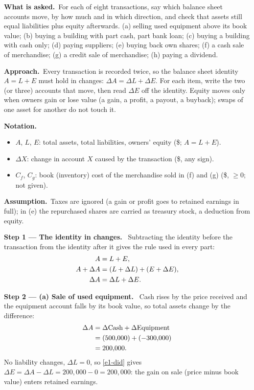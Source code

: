 \documentclass[11pt,a4paper]{article}
\newcommand{\notation}{\par\noindent\textbf{Notation.}}
\newcommand{\step}[2]{\par\medskip\noindent\textbf{Step #1 --- #2.}~}
\newcommand{\assume}{\par\smallskip\noindent\textbf{Assumption.}~}
\newcommand{\asked}{\par\medskip\noindent\textbf{What is asked.}~}
\newcommand{\approach}{\par\smallskip\noindent\textbf{Approach.}~}
\begin{document}
\asked For each of eight transactions, say which balance sheet accounts move, by how much and in
which direction, and check that assets still equal liabilities plus equity afterwards.
(a) selling used equipment above its book value; (b) buying a building with part cash, part bank
loan; (c) buying a building with cash only; (d) paying suppliers; (e) buying back own shares;
(f) a cash sale of merchandise; (g) a credit sale of merchandise; (h) paying a dividend.

\approach Every transaction is recorded twice, so the balance sheet identity $A = L + E$ must hold
in changes: $\Delta A = \Delta L + \Delta E$. For each item, write the two (or three) accounts that
move, then read $\Delta E$ off the identity. Equity moves only when owners gain or lose value
(a gain, a profit, a payout, a buyback); swaps of one asset for another do not touch it.

\notation
\begin{itemize}
  \item $A$, $L$, $E$: total assets, total liabilities, owners' equity (\$; $A = L + E$).
  \item $\Delta X$: change in account $X$ caused by the transaction (\$, any sign).
  \item $C_f$, $C_g$: book (inventory) cost of the merchandise sold in (f) and (g) (\$, $\ge 0$; not given).
\end{itemize}
\assume Taxes are ignored (a gain or profit goes to retained earnings in full); in (e) the
repurchased shares are carried as treasury stock, a deduction from equity.

\step{1}{The identity in changes}
Subtracting the identity before the transaction from the identity after it gives the rule used in
every part:
\begin{align}
  A &= L + E, \label{e1-id}\\
  A + \Delta A &= (L + \Delta L) + (E + \Delta E), \notag\\
  \Delta A &= \Delta L + \Delta E. \label{e1-did}
\end{align}

\step{2}{(a) Sale of used equipment}
Cash rises by the price received and the equipment account falls by its book value, so total assets
change by the difference:
\begin{align}
  \Delta A &= \Delta\text{Cash} + \Delta\text{Equipment} \notag\\
  &= (500{,}000) + (-300{,}000) \notag\\
  &= 200{,}000. \label{e1-a}
\end{align}
No liability changes, $\Delta L = 0$, so \eqref{e1-did} gives $\Delta E = \Delta A - \Delta L =
200{,}000 - 0 = 200{,}000$: the gain on sale (price minus book value) enters retained earnings.
\end{document}
